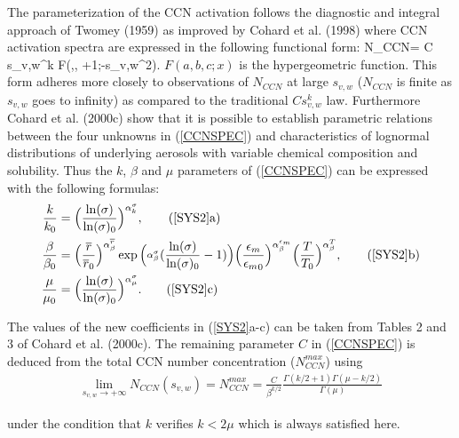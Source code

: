 The parameterization of the CCN activation follows the diagnostic and 
integral approach of Twomey (1959) as improved by Cohard et al. (1998) 
where CCN activation spectra are expressed in the following functional 
form:
%
\beq\label{CCNSPEC}
N_{CCN}= C s_{{v,w}}^k F(\mu,,
		  +1;-\beta s_{{v,w}}^2).
\eeq
%
\noindent $F(a,b,c;x)$ is the hypergeometric function. This form 
adheres more closely to observations of $N_{CCN}$ at large $s_{v,w}$ 
($N_{CCN}$ is finite as $s_{{v,w}}$ goes to infinity) as compared
to the traditional $C s_{{v,w}}^k$ law. Furthermore Cohard et al. (2000c)
show that it is possible to establish parametric relations between the four 
unknowns in (\ref{CCNSPEC}) and characteristics of lognormal distributions
of underlying aerosols with variable chemical composition and solubility.
Thus the $k$, $\beta$ and $\mu$ parameters of
(\ref{CCNSPEC}) can be expressed with the following formulas:
\begin{subequations}\label{SYS2}
\begin{align}
\frac{k}{k_0} & = \Big(\frac{{\rm ln}(\sigma)}{{\rm ln}(\sigma)_0}\Big)^{\alpha_k^{\sigma}},
  \tag{\ref{SYS2}a} \\
\frac{{\beta}}{{\beta}_0} & =
        \Big(\frac{\overline{r}}{\overline{r}_0}\Big)^{\alpha_{\beta}^{\overline{r}}}
    \exp\Big({\raisebox{-0.75ex}{${}^{\alpha_{\beta}^{\sigma}}$}}(\frac{{\rm ln}(\sigma)}{{\rm ln}(\sigma)_0}-1)\Big)
        \Big(\frac{\epsilon_m}{{\epsilon_m}_0}\Big)^{\alpha_{\beta}^{\epsilon_m}}
        \Big(\frac{T}{T_0}\Big)^{\alpha_{\beta}^{T}},
  \tag{\ref{SYS2}b} \\
\frac{{\mu}}{{\mu}_0} & = \Big(\frac{{\rm ln}(\sigma)}{{\rm ln}(\sigma)_0}\Big)^{\alpha_{\mu}^{\sigma}}.
  \tag{\ref{SYS2}c}
\end{align}
\end{subequations}
\addtocounter{equation}{1}
%
\noindent The values of the new coefficients in (\ref{SYS2}a-c) can be taken
from Tables 2 and 3 of Cohard et al. (2000c). The remaining parameter $C$ in
(\ref{CCNSPEC}) is deduced from the total CCN number concentration
($N_{CCN}^{max}$) using
%
\begin{align}
\label{CCNLIM1}
\displaystyle{\lim_{s_{v,w} \rightarrow +\infty}}
N_{CCN}(s_{v,w}) = N_{CCN}^{max} =
  \frac{\displaystyle{C}}{\displaystyle{\beta ^{k/2}}}
   \frac{\displaystyle{\Gamma(k/2 + 1)\Gamma(\mu- k/2)}}
   {\displaystyle{\Gamma(\mu)}}
\end{align}
\addtocounter{equation}{1}
%
\noindent under the condition that $k$ verifies $k<2\mu$ which is always
satisfied here.

